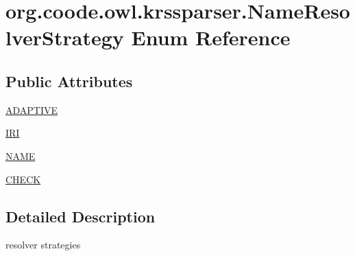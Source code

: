 \hypertarget{enumorg_1_1coode_1_1owl_1_1krssparser_1_1_name_resolver_strategy}{\section{org.\-coode.\-owl.\-krssparser.\-Name\-Resolver\-Strategy Enum Reference}
\label{enumorg_1_1coode_1_1owl_1_1krssparser_1_1_name_resolver_strategy}
}
\subsection*{Public Attributes}
\begin{DoxyCompactItemize}
\item 
\hyperlink{enumorg_1_1coode_1_1owl_1_1krssparser_1_1_name_resolver_strategy_a132044ee556c52dcdff84e0ad4173715}{A\-D\-A\-P\-T\-I\-V\-E}
\item 
\hyperlink{enumorg_1_1coode_1_1owl_1_1krssparser_1_1_name_resolver_strategy_a38ca051a496b2cc014c4ec51ebd892d4}{I\-R\-I}
\item 
\hyperlink{enumorg_1_1coode_1_1owl_1_1krssparser_1_1_name_resolver_strategy_a5630ecd737779e945ee8dacffa68d3ac}{N\-A\-M\-E}
\item 
\hyperlink{enumorg_1_1coode_1_1owl_1_1krssparser_1_1_name_resolver_strategy_aa5241f0fc45ba0b818628a5ded5ee88e}{C\-H\-E\-C\-K}
\end{DoxyCompactItemize}


\subsection{Detailed Description}
resolver strategies 

